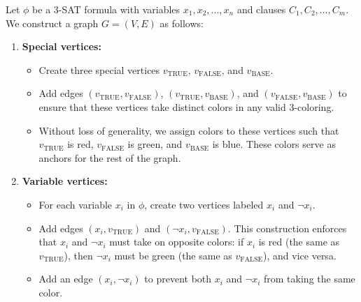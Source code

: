 \documentclass[11pt]{article}
\begin{document}
Let \( \phi \) be a 3-SAT formula with variables \( x_1, x_2, \dots, x_n \) and clauses \( C_1, C_2, \dots, C_m \). We construct a graph \( G = (V, E) \) as follows:

\begin{enumerate}
    \item \textbf{Special vertices:}
    \begin{itemize}
        \item Create three special vertices \( v_{\text{TRUE}} \), \( v_{\text{FALSE}} \), and \( v_{\text{BASE}} \).
        \item Add edges \( (v_{\text{TRUE}}, v_{\text{FALSE}}) \), \( (v_{\text{TRUE}}, v_{\text{BASE}}) \), and \( (v_{\text{FALSE}}, v_{\text{BASE}}) \) to ensure that these vertices take distinct colors in any valid 3-coloring.
        \item Without loss of generality, we assign colors to these vertices such that \( v_{\text{TRUE}} \) is red, \( v_{\text{FALSE}} \) is green, and \( v_{\text{BASE}} \) is blue. These colors serve as anchors for the rest of the graph.
    \end{itemize}
    
    \item \textbf{Variable vertices:}
    \begin{itemize}
        \item For each variable \( x_i \) in \( \phi \), create two vertices labeled \( x_i \) and \( \neg x_i \).
        \item Add edges \( (x_i, v_{\text{TRUE}}) \) and \( (\neg x_i, v_{\text{FALSE}}) \). This construction enforces that \( x_i \) and \( \neg x_i \) must take on opposite colors: if \( x_i \) is red (the same as \( v_{\text{TRUE}} \)), then \( \neg x_i \) must be green (the same as \( v_{\text{FALSE}} \)), and vice versa.
        \item Add an edge \( (x_i, \neg x_i) \) to prevent both \( x_i \) and \( \neg x_i \) from taking the same color.
    \end{itemize}
    

\end{enumerate}
\end{document}
